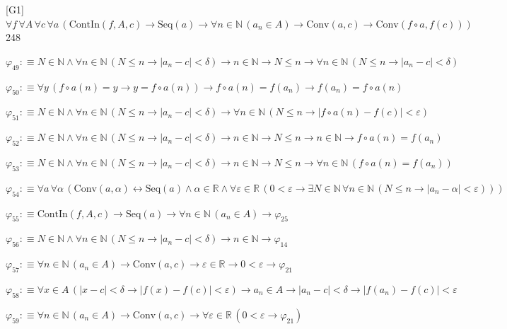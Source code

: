 \begin{fullproof}{[G1]}{$\forall f\,\forall A\,\forall c\,\forall a\,(\mathrm{ContIn}(f,A,c) \to \mathrm{Seq}(a) \to \forall n \in \mathbb{N}\,(a_{n} \in A) \to \mathrm{Conv}(a,c) \to \mathrm{Conv}(f \circ a,f(c)))$}{248}
\begin{abbrevlist}
\item $\varphi_{49} :\equiv N \in \mathbb{N} \land \forall n \in \mathbb{N}\,(N \leq n \to \lvert a_{n} - c \rvert < \delta) \to n \in \mathbb{N} \to N \leq n \to \forall n \in \mathbb{N}\,(N \leq n \to \lvert a_{n} - c \rvert < \delta)$
\item $\varphi_{50} :\equiv \forall y\,(f \circ a(n) = y \to y = f \circ a(n)) \to f \circ a(n) = f(a_{n}) \to f(a_{n}) = f \circ a(n)$
\item $\varphi_{51} :\equiv N \in \mathbb{N} \land \forall n \in \mathbb{N}\,(N \leq n \to \lvert a_{n} - c \rvert < \delta) \to \forall n \in \mathbb{N}\,(N \leq n \to \lvert f \circ a(n) - f(c) \rvert < \varepsilon)$
\item $\varphi_{52} :\equiv N \in \mathbb{N} \land \forall n \in \mathbb{N}\,(N \leq n \to \lvert a_{n} - c \rvert < \delta) \to n \in \mathbb{N} \to N \leq n \to n \in \mathbb{N} \to f \circ a(n) = f(a_{n})$
\item $\varphi_{53} :\equiv N \in \mathbb{N} \land \forall n \in \mathbb{N}\,(N \leq n \to \lvert a_{n} - c \rvert < \delta) \to n \in \mathbb{N} \to N \leq n \to \forall n \in \mathbb{N}\,(f \circ a(n) = f(a_{n}))$
\item $\varphi_{54} :\equiv \forall a\,\forall \alpha\,(\mathrm{Conv}(a,\alpha) \leftrightarrow \mathrm{Seq}(a) \land \alpha \in \mathbb{R} \land \forall \varepsilon \in \mathbb{R}\,(0 < \varepsilon \to \exists N \in \mathbb{N}\,\forall n \in \mathbb{N}\,(N \leq n \to \lvert a_{n} - \alpha \rvert < \varepsilon)))$
\item $\varphi_{55} :\equiv \mathrm{ContIn}(f,A,c) \to \mathrm{Seq}(a) \to \forall n \in \mathbb{N}\,(a_{n} \in A) \to \varphi_{25}$
\item $\varphi_{56} :\equiv N \in \mathbb{N} \land \forall n \in \mathbb{N}\,(N \leq n \to \lvert a_{n} - c \rvert < \delta) \to n \in \mathbb{N} \to \varphi_{14}$
\item $\varphi_{57} :\equiv \forall n \in \mathbb{N}\,(a_{n} \in A) \to \mathrm{Conv}(a,c) \to \varepsilon \in \mathbb{R} \to 0 < \varepsilon \to \varphi_{21}$
\item $\varphi_{58} :\equiv \forall x \in A\,(\lvert x - c \rvert < \delta \to \lvert f(x) - f(c) \rvert < \varepsilon) \to a_{n} \in A \to \lvert a_{n} - c \rvert < \delta \to \lvert f(a_{n}) - f(c) \rvert < \varepsilon$
\item $\varphi_{59} :\equiv \forall n \in \mathbb{N}\,(a_{n} \in A) \to \mathrm{Conv}(a,c) \to \forall \varepsilon \in \mathbb{R}\,(0 < \varepsilon \to \varphi_{21})$

\end{abbrevlist}
\end{fullproof}

